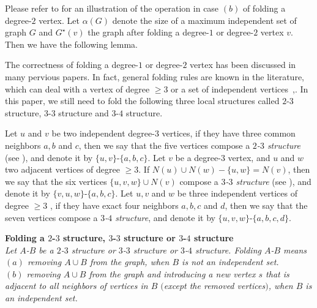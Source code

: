 \documentclass[runningheads]{llncs}
\begin{document}
\vspace{0mm}Please refer to  for an illustration of
the operation in case $(b)$ of folding a degree-$2$ vertex. Let
$\alpha(G)$ denote the size of a maximum independent set of graph
$G$ and $G^\star(v)$ the graph after folding a degree-$1$ or
degree-$2$ vertex $v$. Then we have the following
lemma.
\vspace{-4mm}

The correctness of folding a degree-$1$ or degree-$2$ vertex has
been discussed in many pervious papers. In fact, general folding
rules are known in the literature, which can deal with a vertex of
degree $\geq3$ or a set of independent
vertices~\cite{VC2005},\cite{Fomin:is}. In this paper, we still
need to fold the following three local structures called $2$-$3$
structure, $3$-$3$ structure and $3$-$4$ structure.

Let $u$ and $v$ be two independent degree-$3$ vertices, if they
have three common neighbors $a,b$ and $c$, then we say that the
five vertices compose a \emph{$2$-$3$ structure} (see
), and denote it by $\{u,v\}$-$\{a,b,c\}$. Let $v$
be a degree-$3$ vertex, and $u$ and $w$ two adjacent vertices of
degree $\geq3$. If $N(u)\cup N(w)-\{u,w\}= N(v)$, then we say that
the six vertices $\{u, v, w\}\cup N(v)$ compose a \emph{$3$-$3$
structure} (see ), and denote it by
$\{v,u,w\}$-$\{a,b,c\}$. Let $u, v$ and $w$ be three independent
vertices of degree $\geq3$ , if they have exact four neighbors
$a,b,c$ and $d$, then we say that the seven vertices compose a
\emph{$3$-$4$ structure}, and denote it by
$\{u,v,w\}$-$\{a,b,c,d\}$.

\vspace{2mm}\noindent \textbf{Folding a $2$-$3$ structure, $3$-$3$ structure or $3$-$4$ structure}\\
\emph{Let $A$-$B$ be a $2$-$3$ structure or $3$-$3$ structure or
$3$-$4$ structure. Folding $A$-$B$ means\\
$(a)$ removing $A\cup B$ from the
graph, when $B$ is not an independent set.\\
$(b)$ removing $A\cup B$ from the graph and introducing a new
vertex $s$ that is adjacent to all neighbors of vertices in $B$
$($except the removed vertices$)$, when $B$ is an independent
set.}
\end{document}

